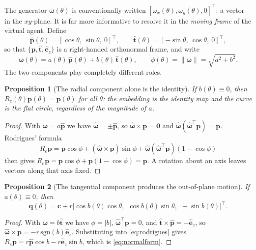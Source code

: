 \documentclass[11pt,a4paper]{article}
\newtheorem{proposition}{Proposition}
\newcommand{\ez}{\hat{\bm{e}}_z}
\newcommand{\q}{\bm{q}}
\newcommand{\pv}{\bm{p}}
\newcommand{\cv}{\bm{c}}
\newcommand{\Rot}{R}
\newcommand{\norm}[1]{\left\lVert#1\right\rVert}
\newcommand{\phat}{\hat{\bm{p}}}
\newcommand{\that}{\hat{\bm{t}}}
\begin{document}
The generator $\bm\omega(\theta)$ is conventionally written
$[\omega_x(\theta),\omega_y(\theta),0]^\top$: a vector in the $xy$-plane. It is
far more informative to resolve it in the \emph{moving frame} of the virtual
agent. Define
\begin{equation}
\phat(\theta) = [\cos\theta,\ \sin\theta,\ 0]^\top,
\qquad
\that(\theta) = [-\sin\theta,\ \cos\theta,\ 0]^\top,
\end{equation}
so that $\{\phat,\that,\ez\}$ is a right-handed orthonormal frame, and write
\begin{equation}
\boxed{\;\bm\omega(\theta) = a(\theta)\,\phat(\theta) + b(\theta)\,\that(\theta),
\qquad \phi(\theta) = \norm{\bm\omega} = \sqrt{a^2+b^2}. \;}
\label{eq:decomp}
\end{equation}
The two components play completely different roles.

\begin{proposition}[The radial component alone is the identity]
\label{prop:radialnoop}
If $b(\theta)\equiv 0$, then $\Rot_e(\theta)\pv(\theta) = \pv(\theta)$ for all
$\theta$: the embedding is the identity map and the curve is the flat circle,
regardless of the magnitude of $a$.
\end{proposition}
\begin{proof}
With $\bm\omega = a\phat$ we have $\hat{\bm\omega} = \pm\phat$, so
$\hat{\bm\omega}\times\pv = \bm 0$ and
$\hat{\bm\omega}(\hat{\bm\omega}^\top\pv) = \pv$. Rodrigues' formula
\begin{equation}
\Rot_e\pv = \pv\cos\phi + (\hat{\bm\omega}\times\pv)\sin\phi
          + \hat{\bm\omega}(\hat{\bm\omega}^\top\pv)(1-\cos\phi)
\label{eq:rodrigues}
\end{equation}
then gives $\Rot_e\pv = \pv\cos\phi + \pv(1-\cos\phi) = \pv$. A rotation about
an axis leaves vectors along that axis fixed.
\end{proof}

\begin{proposition}[The tangential component produces the out-of-plane motion]
\label{prop:tangential}
If $a(\theta)\equiv 0$, then
\begin{equation}
\q(\theta) = \cv + r\big[\cos b(\theta)\cos\theta,\ \ \cos b(\theta)\sin\theta,\ \ -\sin b(\theta)\big]^\top .
\label{eq:normalform}
\end{equation}
\end{proposition}
\begin{proof}
With $\bm\omega = b\that$ we have $\phi=|b|$, $\hat{\bm\omega}^\top\pv = 0$, and
$\that\times\phat = -\ez$, so $\hat{\bm\omega}\times\pv = -r\,\mathrm{sgn}(b)\ez$.
Substituting into \eqref{eq:rodrigues} gives
$\Rot_e\pv = r\phat\cos b - r\ez\sin b$, which is \eqref{eq:normalform}.
\end{proof}
\end{document}
